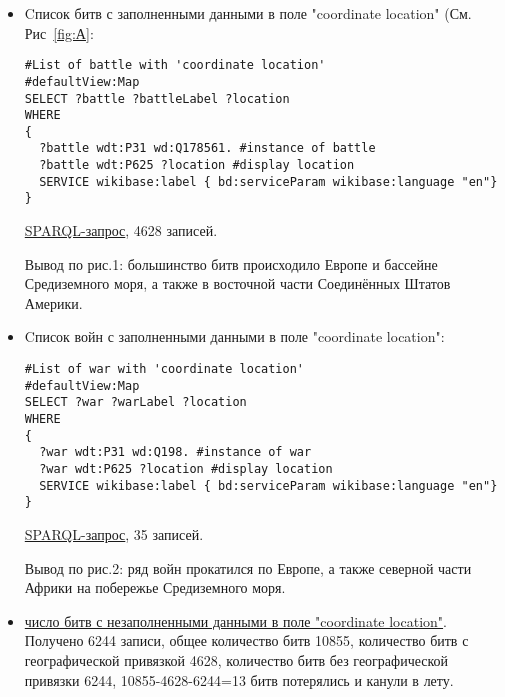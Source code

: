 \begin{itemize}
\item{Cписок битв с заполненными данными в поле "coordinate location" (См. Рис~\ref{fig:А}:}
\begin{lstlisting}[language=SPARQL ]
#List of battle with 'coordinate location' 
#defaultView:Map
SELECT ?battle ?battleLabel ?location
WHERE
{
  ?battle wdt:P31 wd:Q178561. #instance of battle
  ?battle wdt:P625 ?location #display location
  SERVICE wikibase:label { bd:serviceParam wikibase:language "en"}
}
\end{lstlisting}

\href{https://query.wikidata.org/#%23List%20of%20battle%20with%20%27coordinate%20location%27%20%0A%23defaultView%3AMap%0ASELECT%20%3Fbattle%20%3FbattleLabel%20%3Flocation%0AWHERE%0A%7B%0A%20%20%3Fbattle%20wdt%3AP31%20wd%3AQ178561.%20%23instance%20of%20battle%0A%20%20%3Fbattle%20wdt%3AP625%20%3Flocation%20%23display%20location%0A%20%20SERVICE%20wikibase%3Alabel%20%7B%20bd%3AserviceParam%20wikibase%3Alanguage%20%22en%22%7D%0A%7D}{SPARQL-запрос}, 4628 записей.

Вывод по рис.1: большинство битв происходило Европе и бассейне Средиземного моря, а также в восточной части Соединённых Штатов Америки.

\item{Cписок войн с заполненными данными в поле "coordinate location":} 


\begin{lstlisting}[language=SPARQL]
#List of war with 'coordinate location' 
#defaultView:Map
SELECT ?war ?warLabel ?location
WHERE
{
  ?war wdt:P31 wd:Q198. #instance of war
  ?war wdt:P625 ?location #display location
  SERVICE wikibase:label { bd:serviceParam wikibase:language "en"}
}
\end{lstlisting}


\href{https://query.wikidata.org/#%23List%20of%20war%20with%20%27coordinate%20location%27%20%0A%23defaultView%3AMap%0ASELECT%20%3Fwar%20%3FwarLabel%20%3Flocation%0AWHERE%0A%7B%0A%20%20%3Fwar%20wdt%3AP31%20wd%3AQ198.%20%23instance%20of%20war%0A%20%20%3Fwar%20wdt%3AP625%20%3Flocation%20%23display%20location%0A%20%20SERVICE%20wikibase%3Alabel%20%7B%20bd%3AserviceParam%20wikibase%3Alanguage%20%22en%22%7D%0A%7D}{SPARQL-запрос}, 35 записей.

Вывод по рис.2: ряд войн прокатился по Европе, а также северной части Африки на побережье Средиземного моря.

\item{}
\href{https://query.wikidata.org/#%23List%20of%20battle%20with%20unfilled%20property%20%27location%27%20%0ASELECT%20%3Fbattle%20%3FbattleLabel%20%3Flocation%0AWHERE%0A%7B%0A%20%20%3Fbattle%20wdt%3AP31%20wd%3AQ178561.%20%23instance%20of%20battle%0A%20%20FILTER%20NOT%20EXISTS%20%7B%20%3Fbattle%20wdt%3AP625%20%5B%5D%20%7D%20%23if%20property%20location%20is%20unfilled%0A%20%20SERVICE%20wikibase%3Alabel%20%7B%20bd%3AserviceParam%20wikibase%3Alanguage%20%22en%22%7D%0A%7D}{число битв с незаполненными данными в поле "coordinate location"}. Получено 6244 записи, общее количество битв 10855, количество битв с географической привязкой 4628, количество битв без географической привязки 6244, 10855-4628-6244=13 битв потерялись и канули в лету.


\end{itemize}
